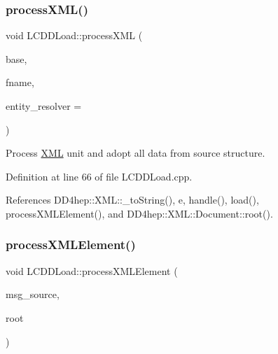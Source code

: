\subsubsection{\texorpdfstring{process\+X\+M\+L()}{processXML()}\hspace{0.1cm}{\footnotesize\ttfamily [2/2]}}
{\footnotesize\ttfamily void L\+C\+D\+D\+Load\+::process\+X\+ML (\begin{DoxyParamCaption}\item[{const \hyperlink{class_d_d4hep_1_1_x_m_l_1_1_handle__t}{X\+M\+L\+::\+Handle\+\_\+t} \&}]{base,  }\item[{const std\+::string \&}]{fname,  }\item[{\hyperlink{class_d_d4hep_1_1_x_m_l_1_1_uri_reader}{X\+M\+L\+::\+Uri\+Reader} $\ast$}]{entity\+\_\+resolver = {} }\end{DoxyParamCaption})\hspace{0.3cm}{\ttfamily [virtual]}}



Process \hyperlink{namespace_d_d4hep_1_1_x_m_l}{X\+ML} unit and adopt all data from source structure. 



Definition at line 66 of file L\+C\+D\+D\+Load.\+cpp.



References D\+D4hep\+::\+X\+M\+L\+::\+\_\+to\+String(), e, handle(), load(), process\+X\+M\+L\+Element(), and D\+D4hep\+::\+X\+M\+L\+::\+Document\+::root().

\hypertarget{class_d_d4hep_1_1_l_c_d_d_load_a4f51d1a8f1e4c726371a0553d3478430}{}\label{class_d_d4hep_1_1_l_c_d_d_load_a4f51d1a8f1e4c726371a0553d3478430} 
\subsubsection{\texorpdfstring{process\+X\+M\+L\+Element()}{processXMLElement()}\hspace{0.1cm}{\footnotesize\ttfamily [1/2]}}
{\footnotesize\ttfamily void L\+C\+D\+D\+Load\+::process\+X\+M\+L\+Element (\begin{DoxyParamCaption}\item[{const std\+::string \&}]{msg\+\_\+source,  }\item[{const \hyperlink{class_d_d4hep_1_1_x_m_l_1_1_handle__t}{X\+M\+L\+::\+Handle\+\_\+t} \&}]{root }\end{DoxyParamCaption})\hspace{0.3cm}{\ttfamily [virtual]}}



